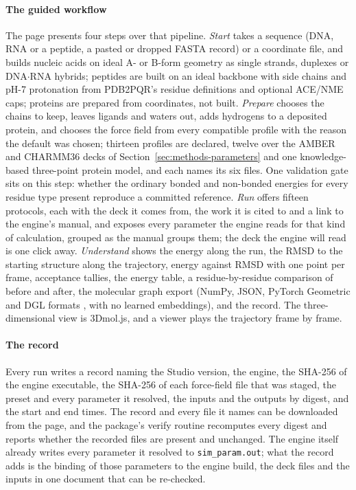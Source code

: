 \paragraph{The guided workflow}
The page presents four steps over that pipeline. \emph{Start} takes a sequence (DNA, RNA or a peptide, a pasted or
dropped FASTA record) or a coordinate file, and builds nucleic acids on ideal
A- or B-form geometry as single strands, duplexes or DNA$\cdot$RNA hybrids;
peptides are built on an ideal backbone with side chains and pH-7 protonation
from PDB2PQR's residue definitions\cite{dolinsky2004pdb2pqr,jurrus2018apbs}
and optional ACE/NME caps; proteins are prepared from coordinates, not built.
\emph{Prepare} chooses the chains to keep, leaves ligands and waters out, adds
hydrogens to a deposited protein, and chooses the force field from every
compatible profile with the reason the default was chosen; thirteen profiles
are declared, twelve over the AMBER and CHARMM36 decks of
Section~\ref{sec:methods-parameters} and one knowledge-based three-point
protein model, and each names its six files. One validation gate
sits on this step: whether the ordinary bonded and non-bonded energies for
every residue type present reproduce a committed reference. \emph{Run} offers
fifteen protocols, each with the deck it comes from, the work it is cited to
and a link to the engine's manual, and exposes every parameter the engine reads
for that kind of calculation, grouped as the manual groups them; the deck the
engine will read is one click away. \emph{Understand} shows the energy along
the run, the RMSD to the starting structure along the trajectory, energy
against RMSD with one point per frame, acceptance tallies, the energy table, a
residue-by-residue comparison of before and after, the molecular graph export
(NumPy, JSON, PyTorch Geometric and DGL formats
\cite{fey2019pyg,wang2019dgl}, with no learned embeddings), and the record.
The three-dimensional view is 3Dmol.js\cite{rego2015threedmol}, and a viewer
plays the trajectory frame by frame.

\paragraph{The record}
Every run writes a record naming the Studio version, the engine, the SHA-256 of
the engine executable, the SHA-256 of each force-field file that was staged,
the preset and every parameter it resolved, the inputs and the outputs by
digest, and the start and end times. The record and every file it names
can be downloaded from the page, and the package's verify routine recomputes
every digest and reports whether the recorded files are present and unchanged.
The engine itself already writes every parameter it resolved to
\texttt{sim\_param.out}; what the record adds is the binding of those
parameters to the engine build, the deck files and the inputs in one document
that can be re-checked.

